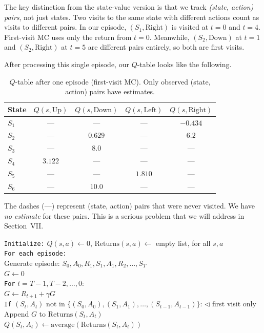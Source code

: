 \documentclass[journal, onecolumn]{IEEEtran}
\begin{document}
The key distinction from the state-value version is that we track \textit{(state, action) pairs}, not just states. Two visits to the same state with different actions count as visits to different pairs. In our episode, $(S_1, \text{Right})$ is visited at $t=0$ and $t=4$. First-visit MC uses only the return from $t=0$. Meanwhile, $(S_2, \text{Down})$ at $t=1$ and $(S_2, \text{Right})$ at $t=5$ are different pairs entirely, so both are first visits.

After processing this single episode, our $Q$-table looks like the following.

\begin{table}[H]
\centering
\caption{$Q$-table after one episode (first-visit MC). Only observed (state, action) pairs have estimates.}
\label{tab:qtable}
\begin{tabular}{lcccc}
\toprule
\textbf{State} & $Q(s, \text{Up})$ & $Q(s, \text{Down})$ & $Q(s, \text{Left})$ & $Q(s, \text{Right})$ \\
\midrule
$S_1$ & --- & --- & --- & $-0.434$ \\
$S_2$ & --- & $0.629$ & --- & $6.2$ \\
$S_3$ & --- & $8.0$ & --- & --- \\
$S_4$ & $3.122$ & --- & --- & --- \\
$S_5$ & --- & --- & $1.810$ & --- \\
$S_6$ & --- & $10.0$ & --- & --- \\
\bottomrule
\end{tabular}
\end{table}

The dashes (---) represent (state, action) pairs that were never visited. We have \textit{no estimate} for these pairs. This is a serious problem that we will address in Section~VII.

\begin{tcolorbox}[examplebox={First-Visit MC for $Q(s,a)$ Pseudocode}]
\texttt{Initialize:} $Q(s,a) \leftarrow 0$, $\text{Returns}(s,a) \leftarrow$ empty list, for all $s, a$\\[4pt]
\texttt{For each episode:}\\
\quad Generate episode: $S_0, A_0, R_1, S_1, A_1, R_2, \ldots, S_T$\\
\quad $G \leftarrow 0$\\
\quad \texttt{For} $t = T-1, T-2, \ldots, 0$:\\
\quad\quad $G \leftarrow R_{t+1} + \gamma G$\\
\quad\quad \texttt{If} $(S_t, A_t)$ not in $\{(S_0,A_0), (S_1,A_1), \ldots, (S_{t-1},A_{t-1})\}$: \hfill \textcolor{Garnet}{$\triangleleft$ first visit only}\\
\quad\quad\quad Append $G$ to $\text{Returns}(S_t, A_t)$\\
\quad\quad\quad $Q(S_t, A_t) \leftarrow \text{average}(\text{Returns}(S_t, A_t))$
\end{tcolorbox}
\end{document}
